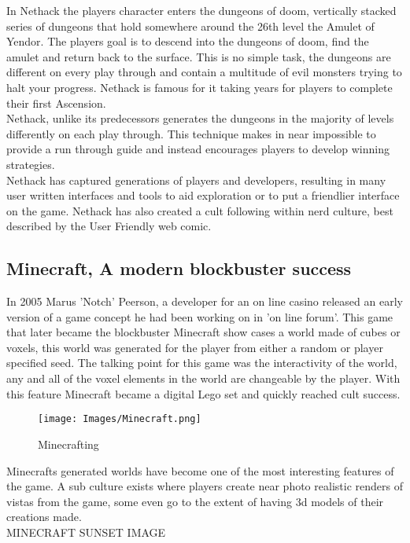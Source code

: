 In Nethack the players character enters the dungeons of doom, vertically stacked
series of dungeons that hold somewhere around the 26th level the Amulet of 
Yendor. The players goal is to descend into the dungeons of doom, find the
amulet and return back to the surface. This is no simple task, the dungeons are 
different on every play through and contain a multitude of evil monsters trying
to halt your progress. Nethack is famous for it taking years for players to 
complete their first Ascension.\\

Nethack, unlike its predecessors generates the dungeons in the majority of levels
differently on each play through. This technique makes in near impossible to 
provide a run through guide and instead encourages players to develop winning
strategies.\\

Nethack has captured generations of players and developers, resulting in many 
user written interfaces and tools to aid exploration or to put a friendlier 
interface on the game. Nethack has also created a cult following within nerd 
culture, best described by the User Friendly web comic.\\

\subsection*{Minecraft, A modern blockbuster success}
In 2005 Marus 'Notch' Peerson, a developer for an on line casino released an
early version of a game concept he had been working on in 'on line forum'. This
game that later became the blockbuster Minecraft show cases a world made of cubes 
or voxels, this world was generated for the player from either a random or 
player specified seed. The talking point for this game was the interactivity of
the world, any and all of the voxel elements in the world are changeable by the
player. With this feature Minecraft became a digital Lego set and quickly 
reached cult success.\\

\begin{figure}[h!]
  \texttt{[image: Images/Minecraft.png]}
  \caption{Minecrafting}
\end{figure}

Minecrafts generated worlds have become one of the most interesting features of 
the game. A sub culture exists where players create near photo realistic renders
of vistas from the game, some even go to the extent of having 3d models of their
creations made. \\

MINECRAFT SUNSET IMAGE\\
